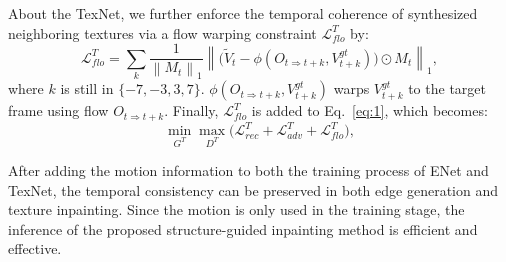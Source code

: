 About the TexNet, we further enforce the temporal coherence of synthesized neighboring textures via a flow warping constraint $\mathcal{L}^T_{flo}$ by: 
\begin{equation}
	\label{eq:inp_flow}
		\mathcal{L}^T_{flo}=\sum_{k}\frac{1}{\left\|M_{t} \right\|_1}\left\|\big(\widetilde{V}_{t}-\phi(O_{t\Rightarrow t+k},V_{t+k}^{gt})\big)\odot M_{t}\right\|_1,
	\end{equation}
	where  $k$ is still in $\{-7,-3, 3, 7\}$. $\phi(O_{t\Rightarrow t+k},V_{t+k}^{gt})$ warps $V_{t+k}^{gt}$ to the target frame using flow $O_{t\Rightarrow t+k}$. Finally, $\mathcal{L}^T_{flo}$ is added to Eq.~\eqref{eq:1}, which becomes:
\begin{equation}
\label{eq:1_}
\min\limits_{G^T} \max \limits_{D^T} \big(\mathcal{L}^{T}_{rec}+\mathcal{L}^T_{adv} +\mathcal{L}^T_{flo}\big),
\end{equation}

After adding the motion information to both the training process of ENet and TexNet, the temporal consistency can be preserved in both edge generation and texture inpainting.
Since the motion is only used in the training stage, the inference of the proposed structure-guided inpainting method is efficient and effective.








	